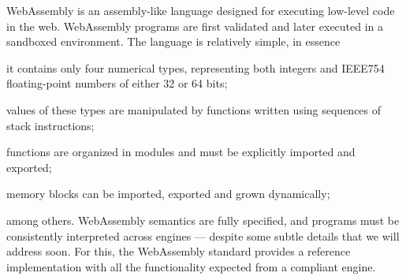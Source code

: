 \documentclass[sigconf,review,anonymous]{acmart}
\begin{document}
WebAssembly \cite{haas2017bringing} is an assembly-like language designed for
executing low-level code in the web.
%
WebAssembly programs are first validated
%
%
and later executed in a sandboxed environment.
%
%
The language is relatively simple, in essence
%
\begin{inparaenum}
  \item it contains only four numerical types, representing both integers and
    IEEE754 floating-point numbers of either 32 or 64 bits;
  \item values of these types are manipulated by functions written using
    sequences of stack instructions;
  \item functions are organized in modules and must be explicitly imported and
    exported;
  \item memory blocks can be imported, exported and grown dynamically;
\end{inparaenum}
%
among others.
%
%
WebAssembly semantics are fully specified, and programs must be consistently
interpreted across engines --- despite some subtle details that we will address
soon.
%
For this, the WebAssembly standard provides a reference implementation with all
the functionality expected from a compliant engine.
%
\end{document}
